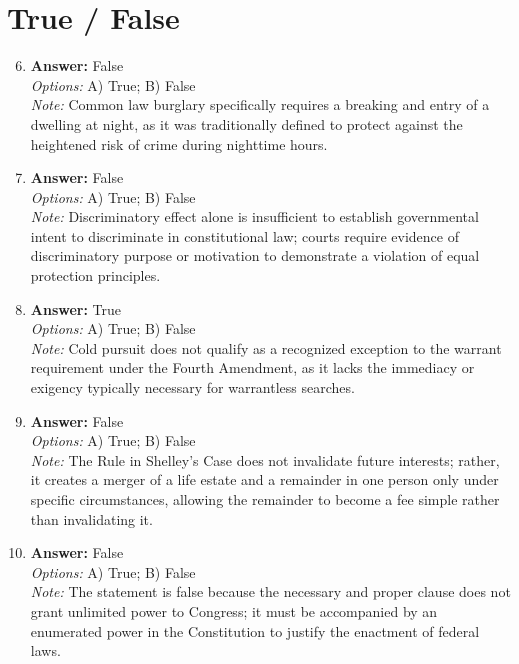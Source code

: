 \documentclass[12pt]{article}
\begin{document}
\section*{True / False}
\begin{enumerate}[label=\arabic*.]
\setcounter{enumi}{5}
\item \textbf{Answer:} False
\\ \textit{Options:} A) True; B) False
\\ \textit{Note:} Common law burglary specifically requires a breaking and entry of a dwelling at night, as it was traditionally defined to protect against the heightened risk of crime during nighttime hours.
\item \textbf{Answer:} False
\\ \textit{Options:} A) True; B) False
\\ \textit{Note:} Discriminatory effect alone is insufficient to establish governmental intent to discriminate in constitutional law; courts require evidence of discriminatory purpose or motivation to demonstrate a violation of equal protection principles.
\item \textbf{Answer:} True
\\ \textit{Options:} A) True; B) False
\\ \textit{Note:} Cold pursuit does not qualify as a recognized exception to the warrant requirement under the Fourth Amendment, as it lacks the immediacy or exigency typically necessary for warrantless searches.
\item \textbf{Answer:} False
\\ \textit{Options:} A) True; B) False
\\ \textit{Note:} The Rule in Shelley's Case does not invalidate future interests; rather, it creates a merger of a life estate and a remainder in one person only under specific circumstances, allowing the remainder to become a fee simple rather than invalidating it.
\item \textbf{Answer:} False
\\ \textit{Options:} A) True; B) False
\\ \textit{Note:} The statement is false because the necessary and proper clause does not grant unlimited power to Congress; it must be accompanied by an enumerated power in the Constitution to justify the enactment of federal laws.
\end{enumerate}
\end{document}
